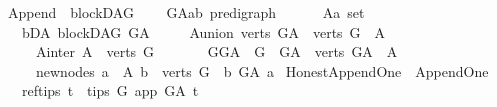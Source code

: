 \begin{isabellebody}
\isanewline
\isanewline
{}\isamarkupfalse%
\ Append\ {\isacharequal}{\kern0pt}\ blockDAG\ {\isacharplus}{\kern0pt}\isanewline
\ \ \ G{\isacharunderscore}{\kern0pt}A{\isacharcolon}{\kern0pt}{\isacharcolon}{\kern0pt}{\isachardoublequoteopen}{\isacharparenleft}{\kern0pt}{\isacharprime}{\kern0pt}a{\isacharcomma}{\kern0pt}{\isacharprime}{\kern0pt}b{\isacharparenright}{\kern0pt}\ pre{\isacharunderscore}{\kern0pt}digraph{\isachardoublequoteclose}\ {\isacharparenleft}{\kern0pt}\isanewline
\ \ \ \ \ A{\isacharcolon}{\kern0pt}{\isacharcolon}{\kern0pt}{\isachardoublequoteopen}{\isacharprime}{\kern0pt}a\ set{\isachardoublequoteclose}\isanewline
\ \ \ bD{\isacharunderscore}{\kern0pt}A{\isacharcolon}{\kern0pt}\ {\isachardoublequoteopen}blockDAG\ G{\isacharunderscore}{\kern0pt}A{\isachardoublequoteclose}\isanewline
\ \ \ \ \ A{\isacharunderscore}{\kern0pt}union{\isacharcolon}{\kern0pt}\ {\isachardoublequoteopen}verts\ G{\isacharunderscore}{\kern0pt}A\ {\isacharequal}{\kern0pt}\ verts\ G\ {\isasymunion}\ A{\isachardoublequoteclose}\isanewline
\ \ \ \ \ A{\isacharunderscore}{\kern0pt}inter{\isacharcolon}{\kern0pt}\ {\isachardoublequoteopen}A\ {\isasyminter}\ verts\ G\ {\isacharequal}{\kern0pt}\ {\isacharbraceleft}{\kern0pt}{\isacharbraceright}{\kern0pt}{\isachardoublequoteclose}\isanewline
\ \ \ \ \ GG{\isacharunderscore}{\kern0pt}A\ {\isacharcolon}{\kern0pt}\ {\isachardoublequoteopen}G\ {\isacharequal}{\kern0pt}\ G{\isacharunderscore}{\kern0pt}A\ {\isasymrestriction}\ {\isacharparenleft}{\kern0pt}verts\ G{\isacharunderscore}{\kern0pt}A\ {\isacharminus}{\kern0pt}\ A{\isacharparenright}{\kern0pt}{\isachardoublequoteclose}\isanewline
\ \ \ \ \ new{\isacharunderscore}{\kern0pt}nodes{\isacharcolon}{\kern0pt}\ {\isachardoublequoteopen}{\isasymforall}a\ {\isasymin}\ A{\isachardot}{\kern0pt}\ {\isasymforall}b\ {\isasymin}\ verts\ G{\isachardot}{\kern0pt}\ {\isasymnot}\ b\ {\isasymrightarrow}\isactrlbsub G{\isacharunderscore}{\kern0pt}A\isactrlesub \ a{\isachardoublequoteclose}\isanewline
\isanewline
{}\isamarkupfalse%
\ Honest{\isacharunderscore}{\kern0pt}Append{\isacharunderscore}{\kern0pt}One\ {\isacharequal}{\kern0pt}\ Append{\isacharunderscore}{\kern0pt}One\ {\isacharplus}{\kern0pt}\isanewline
\ \ \ ref{\isacharunderscore}{\kern0pt}tips{\isacharcolon}{\kern0pt}\ {\isachardoublequoteopen}{\isasymforall}t\ {\isasymin}\ tips\ G{\isachardot}{\kern0pt}\ app\ {\isasymrightarrow}\isactrlbsub G{\isacharunderscore}{\kern0pt}A\isactrlesub \ t{\isachardoublequoteclose}\ \ \isanewline

\end{isabellebody}
